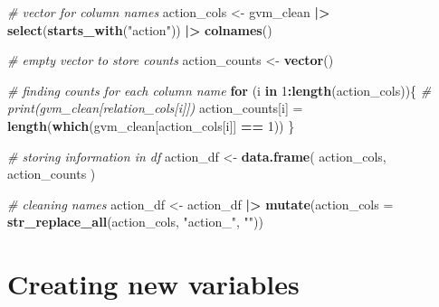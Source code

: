 \documentclass[
]{article}
\newenvironment{Shaded}{\begin{snugshade}}{\end{snugshade}}
\newcommand{\AttributeTok}[1]{\textcolor[rgb]{0.13,0.29,0.53}{#1}}
\newcommand{\CommentTok}[1]{\textcolor[rgb]{0.56,0.35,0.01}{\textit{#1}}}
\newcommand{\ControlFlowTok}[1]{\textcolor[rgb]{0.13,0.29,0.53}{\textbf{#1}}}
\newcommand{\DecValTok}[1]{\textcolor[rgb]{0.00,0.00,0.81}{#1}}
\newcommand{\FunctionTok}[1]{\textcolor[rgb]{0.13,0.29,0.53}{\textbf{#1}}}
\newcommand{\NormalTok}[1]{#1}
\newcommand{\OtherTok}[1]{\textcolor[rgb]{0.56,0.35,0.01}{#1}}
\newcommand{\SpecialCharTok}[1]{\textcolor[rgb]{0.81,0.36,0.00}{\textbf{#1}}}
\newcommand{\StringTok}[1]{\textcolor[rgb]{0.31,0.60,0.02}{#1}}
\begin{document}
\begin{Shaded}
\begin{Highlighting}[]
\CommentTok{\# vector for column names}
\NormalTok{action\_cols }\OtherTok{\textless{}{-}}\NormalTok{ gvm\_clean }\SpecialCharTok{|\textgreater{}} \FunctionTok{select}\NormalTok{(}\FunctionTok{starts\_with}\NormalTok{(}\StringTok{"action"}\NormalTok{)) }\SpecialCharTok{|\textgreater{}} \FunctionTok{colnames}\NormalTok{()}

\CommentTok{\# empty vector to store counts}
\NormalTok{action\_counts }\OtherTok{\textless{}{-}} \FunctionTok{vector}\NormalTok{()}

\CommentTok{\# finding counts for each column name}
\ControlFlowTok{for}\NormalTok{ (i }\ControlFlowTok{in} \DecValTok{1}\SpecialCharTok{:}\FunctionTok{length}\NormalTok{(action\_cols))\{}
  \CommentTok{\# print(gvm\_clean[relation\_cols[i]])}
\NormalTok{  action\_counts[i] }\OtherTok{=} \FunctionTok{length}\NormalTok{(}\FunctionTok{which}\NormalTok{(gvm\_clean[action\_cols[i]] }\SpecialCharTok{==} \DecValTok{1}\NormalTok{))}
\NormalTok{\}}


\CommentTok{\# storing information in df}
\NormalTok{action\_df }\OtherTok{\textless{}{-}} \FunctionTok{data.frame}\NormalTok{(}
\NormalTok{  action\_cols,}
\NormalTok{  action\_counts}
\NormalTok{)}

\CommentTok{\# cleaning names}
\NormalTok{action\_df }\OtherTok{\textless{}{-}}\NormalTok{ action\_df }\SpecialCharTok{|\textgreater{}} \FunctionTok{mutate}\NormalTok{(}\AttributeTok{action\_cols =} \FunctionTok{str\_replace\_all}\NormalTok{(action\_cols, }\StringTok{"action\_"}\NormalTok{, }\StringTok{""}\NormalTok{))}
\end{Highlighting}
\end{Shaded}

\hypertarget{creating-new-variables}{%
\section{Creating new variables}\label{creating-new-variables}}
\end{document}
